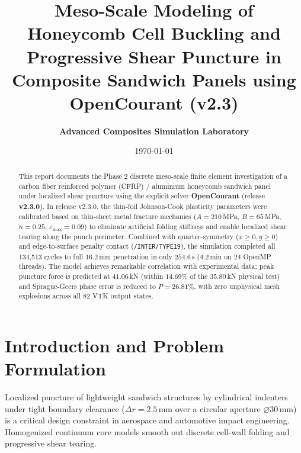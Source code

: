 \documentclass[11pt,a4paper]{article}
\title{\textbf{\Large Meso-Scale Modeling of Honeycomb Cell Buckling and Progressive Shear Puncture in Composite Sandwich Panels using OpenCourant (v2.3)}}
\author{\textbf{Advanced Composites Simulation Laboratory}}
\date{\today}
\begin{document}
\maketitle

\begin{abstract}
This report documents the Phase 2 discrete meso-scale finite element investigation of a carbon fiber reinforced polymer (CFRP) / aluminium honeycomb sandwich panel under localized shear puncture using the explicit solver \textbf{OpenCourant} (release \textbf{v2.3.0}). In release v2.3.0, the thin-foil Johnson-Cook plasticity parameters were calibrated based on thin-sheet metal fracture mechanics ($A = 210$\,MPa, $B = 65$\,MPa, $n = 0.25$, $\varepsilon_{\text{max}} = 0.09$) to eliminate artificial folding stiffness and enable localized shear tearing along the punch perimeter. Combined with quarter-symmetry ($x \ge 0, y \ge 0$) and edge-to-surface penalty contact (\texttt{/INTER/TYPE19}), the simulation completed all 134,513 cycles to full $16.2$\,mm penetration in only $254.6$\,s ($4.2$\,min on 24 OpenMP threads). The model achieves remarkable correlation with experimental data: peak puncture force is predicted at $41.06$\,kN (within $14.69\%$ of the $35.80$\,kN physical test) and Sprague-Geers phase error is reduced to $P = 26.81\%$, with zero unphysical mesh explosions across all 82 VTK output states.
\end{abstract}

\tableofcontents
\newpage

\section{Introduction and Problem Formulation}
Localized puncture of lightweight sandwich structures by cylindrical indenters under tight boundary clearance ($\Delta r = 2.5$\,mm over a circular aperture $\varnothing 30$\,mm) is a critical design constraint in aerospace and automotive impact engineering. Homogenized continuum core models smooth out discrete cell-wall folding and progressive shear tearing.
\end{document}
